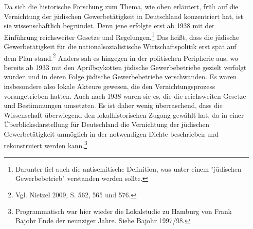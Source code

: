 Da sich die historische Forschung zum Thema, wie oben erläutert, früh auf die Vernichtung der jüdischen Gewerbetätigkeit in Deutschland konzentriert hat, ist sie wissenschaftlich begründet. Denn jene erfolgte erst ab 1938 mit der Einführung reichsweiter Gesetze und Regelungen.\footnote{Darunter fiel auch die antisemitische Definition, was unter einem "jüdischen Gewerbebetrieb" verstanden werden sollte.} Das heißt, dass die jüdische Gewerbetätigkeit für die nationalsozialistische Wirtschaftspolitik erst spät auf dem Plan stand.\footnote{Vgl. Nietzel 2009, S. 562, 565 und 576.} Anders sah es hingegen in der politischen Peripherie aus, wo bereits ab 1933 mit den Aprilboykotten jüdische Gewerbebetriebe gezielt verfolgt wurden und in deren Folge jüdische Gewerbebetriebe verschwanden. Es waren insbesondere also lokale Akteure gewesen, die den Vernichtungsprozess vorangetrieben hatten. Auch nach 1938 waren sie es, die die reichsweiten Gesetze und Bestimmungen umsetzten. Es ist daher wenig überraschend, dass die Wissenschaft überwiegend den lokalhistorischen Zugang gewählt hat, da in einer Überblicksdarstellung für Deutschland die Vernichtung der jüdischen Gewerbetätigkeit unmöglich in der notwendigen Dichte beschrieben und rekonstruiert werden kann.\footnote{Programmatisch war hier wieder die Lokalstudie zu Hamburg von Frank Bajohr Ende der neunziger Jahre. Siehe Bajohr 1997/98.} 

